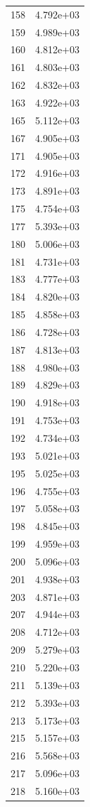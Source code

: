\documentclass[12pt]{article}
\begin{document}
\begin{longtable}{@{}cc@{}}
158 & 4.792e+03 \\
159 & 4.989e+03 \\
160 & 4.812e+03 \\
161 & 4.803e+03 \\
162 & 4.832e+03 \\
163 & 4.922e+03 \\
165 & 5.112e+03 \\
167 & 4.905e+03 \\
171 & 4.905e+03 \\
172 & 4.916e+03 \\
173 & 4.891e+03 \\
175 & 4.754e+03 \\
177 & 5.393e+03 \\
180 & 5.006e+03 \\
181 & 4.731e+03 \\
183 & 4.777e+03 \\
184 & 4.820e+03 \\
185 & 4.858e+03 \\
186 & 4.728e+03 \\
187 & 4.813e+03 \\
188 & 4.980e+03 \\
189 & 4.829e+03 \\
190 & 4.918e+03 \\
191 & 4.753e+03 \\
192 & 4.734e+03 \\
193 & 5.021e+03 \\
195 & 5.025e+03 \\
196 & 4.755e+03 \\
197 & 5.058e+03 \\
198 & 4.845e+03 \\
199 & 4.959e+03 \\
200 & 5.096e+03 \\
201 & 4.938e+03 \\
203 & 4.871e+03 \\
207 & 4.944e+03 \\
208 & 4.712e+03 \\
209 & 5.279e+03 \\
210 & 5.220e+03 \\
211 & 5.139e+03 \\
212 & 5.393e+03 \\
213 & 5.173e+03 \\
215 & 5.157e+03 \\
216 & 5.568e+03 \\
217 & 5.096e+03 \\
218 & 5.160e+03 \\

\end{longtable}
\end{document}
